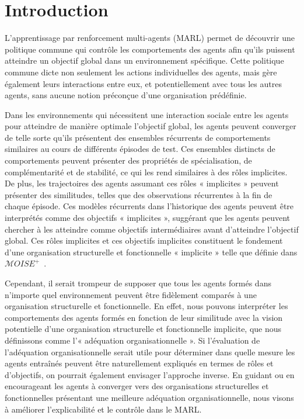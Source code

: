 \section{Introduction}

L'apprentissage par renforcement multi-agents (MARL) permet de découvrir une politique commune qui contrôle les comportements des agents afin qu'ils puissent atteindre un objectif global dans un environnement spécifique.
Cette politique commune dicte non seulement les actions individuelles des agents, mais gère également leurs interactions entre eux, et potentiellement avec tous les autres agents, sans aucune notion préconçue d'une organisation prédéfinie.

Dans les environnements qui nécessitent une interaction sociale entre les agents pour atteindre de manière optimale l'objectif global, les agents peuvent converger de telle sorte qu'ils présentent des ensembles récurrents de comportements similaires au cours de différents épisodes de test.
Ces ensembles distincts de comportements peuvent présenter des propriétés de spécialisation, de complémentarité et de stabilité, ce qui les rend similaires à des rôles implicites. De plus, les trajectoires des agents assumant ces rôles « implicites » peuvent présenter des similitudes, telles que des observations récurrentes à la fin de chaque épisode. Ces modèles récurrents dans l'historique des agents peuvent être interprétés comme des objectifs « implicites », suggérant que les agents peuvent chercher à les atteindre comme objectifs intermédiaires avant d'atteindre l'objectif global. Ces rôles implicites et ces objectifs implicites constituent le fondement d'une organisation structurelle et fonctionnelle « implicite » telle que définie dans $\mathcal{M}OISE^+$~\cite{Hubner2007}.

Cependant, il serait trompeur de supposer que tous les agents formés dans n'importe quel environnement peuvent être fidèlement comparés à une organisation structurelle et fonctionnelle. En effet, nous pouvons interpréter les comportements des agents formés en fonction de leur similitude avec la vision potentielle d'une organisation structurelle et fonctionnelle implicite, que nous définissons comme l'« adéquation organisationnelle ».
Si l'évaluation de l'adéquation organisationnelle serait utile pour déterminer dans quelle mesure les agents entraînés peuvent être naturellement expliqués en termes de rôles et d'objectifs, on pourrait également envisager l'approche inverse. En guidant ou en encourageant les agents à converger vers des organisations structurelles et fonctionnelles présentant une meilleure adéquation organisationnelle, nous visons à améliorer l'explicabilité et le contrôle dans le MARL.

